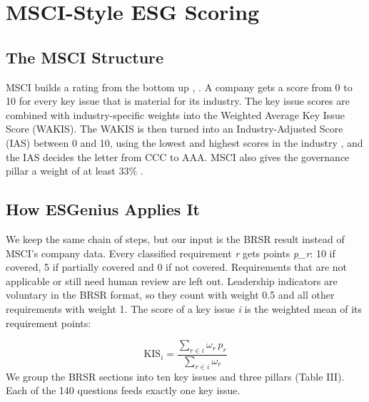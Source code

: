 \documentclass[conference]{IEEEtran}
\begin{document}
\section{MSCI-Style ESG Scoring}
\subsection{The MSCI Structure}
MSCI builds a rating from the bottom up \cite{b2}, \cite{b4}. A company gets a score from 0 to 10 for every key issue that is material for its industry. The key issue scores are combined with industry-specific weights into the Weighted Average Key Issue Score (WAKIS). The WAKIS is then turned into an Industry-Adjusted Score (IAS) between 0 and 10, using the lowest and highest scores in the industry \cite{b3}, and the IAS decides the letter from CCC to AAA. MSCI also gives the governance pillar a weight of at least 33\% \cite{b4}.

\subsection{How ESGenius Applies It}
We keep the same chain of steps, but our input is the BRSR result instead of MSCI's company data. Every classified requirement \textit{r} gets points \textit{p\_r}: 10 if covered, 5 if partially covered and 0 if not covered. Requirements that are not applicable or still need human review are left out. Leadership indicators are voluntary in the BRSR format, so they count with weight 0.5 and all other requirements with weight 1. The score of a key issue \textit{i} is the weighted mean of its requirement points:

\begin{equation}\mathrm{KIS}_i=\frac{\sum_{r\in i}\omega_r\,p_r}{\sum_{r\in i}\omega_r}\end{equation}
We group the BRSR sections into ten key issues and three pillars (Table III). Each of the 140 questions feeds exactly one key issue.
\end{document}
